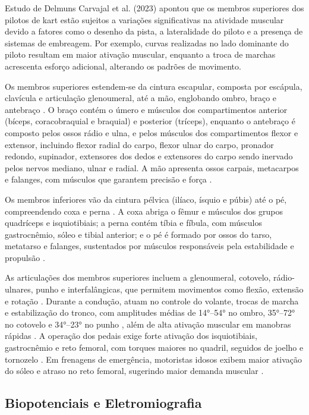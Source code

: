 \documentclass[symbols]{fei}
\begin{document}
Estudo de Delmuns Carvajal et al. (2023) apontou que os membros superiores dos pilotos de kart estão sujeitos a variações significativas 
na atividade muscular devido a fatores como o desenho da pista, a lateralidade do piloto e a presença de sistemas de embreagem. 
Por exemplo, curvas realizadas no lado dominante do piloto resultam em maior ativação muscular, enquanto a troca de marchas acrescenta 
esforço adicional, alterando os padrões de movimento. 

Os membros superiores estendem-se da cintura escapular, composta por escápula, clavícula e articulação glenoumeral, até a mão, englobando ombro, 
braço e antebraço \cite{kenhub_upper}. O braço contém o úmero e músculos dos compartimentos anterior (bíceps, coracobraquial e braquial) e posterior (tríceps), 
enquanto o antebraço é composto pelos ossos rádio e ulna, e pelos músculos dos compartimentos flexor e extensor, incluindo flexor radial do carpo, 
flexor ulnar do carpo, pronador redondo, supinador, extensores dos dedos e extensores do carpo sendo inervado pelos nervos mediano, ulnar e radial. A mão apresenta ossos 
carpais, metacarpos e falanges, com músculos que garantem precisão e força \cite{kenhub_hand}.

Os membros inferiores vão da cintura pélvica (ilíaco, ísquio e púbis) até o pé, compreendendo coxa e perna \cite{kenhub_lower}. A coxa abriga o fêmur e 
músculos dos grupos quadríceps e isquiotibiais; a perna contém tíbia e fíbula, com músculos gastrocnêmio, sóleo e tibial anterior; e o pé é formado por ossos do 
tarso, metatarso e falanges, sustentados por músculos responsáveis pela estabilidade e propulsão \cite{ncbi_footmuscles}.

As articulações dos membros superiores incluem a glenoumeral, cotovelo, rádio-ulnares, 
punho e interfalângicas, que permitem movimentos como flexão, extensão e rotação \cite{pubmed_joints}. Durante a condução, 
atuam no controle do volante, trocas de marcha e estabilização do tronco, com amplitudes médias de 14°–54° no ombro, 35°–72° 
no cotovelo e 34°–23° no punho \cite{monash_upper}, além de alta ativação muscular em manobras rápidas \cite{pubmed_upper_activation}. A operação dos 
pedais exige forte ativação dos isquiotibiais, gastrocnêmio e reto femoral, com torques maiores no quadril, seguidos de joelho e 
tornozelo \cite{mdpi_lower}. Em frenagens de emergência, motoristas idosos exibem maior ativação do sóleo e atraso no reto femoral, sugerindo maior 
demanda muscular \cite{pubmed_lower_reaction}.

\subsection{Biopotenciais e Eletromiografia}
\end{document}
